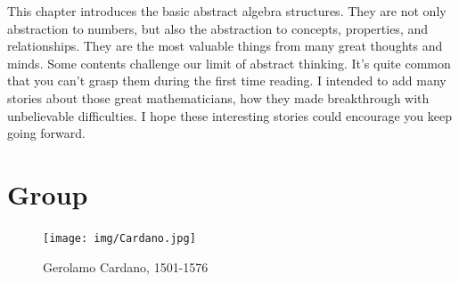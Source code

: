 \documentclass[b5paper]{article}
\begin{document}
This chapter introduces the basic abstract algebra structures. They are not only abstraction to numbers, but also the abstraction to concepts, properties, and relationships. They are the most valuable things from many great thoughts and minds. Some contents challenge our limit of abstract thinking. It's quite common that you can't grasp them during the first time reading. I intended to add many stories about those great mathematicians, how they made breakthrough with unbelievable difficulties. I hope these interesting stories could encourage you keep going forward.

\section{Group}

\begin{figure}[htbp]
 \centering
 \texttt{[image: img/Cardano.jpg]}
 \captionsetup{labelformat=empty}
 \caption{Gerolamo Cardano, 1501-1576}
 \label{fig:Cardano}
\end{figure}

\end{document}
